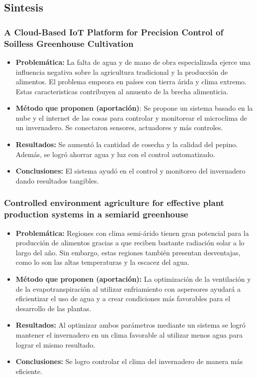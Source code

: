 \documentclass[final,12pt]{article}
\begin{document}
\subsection{Sintesis}
\subsubsection{A Cloud-Based IoT Platform for Precision Control of Soilless Greenhouse Cultivation}
\begin{itemize}
    \item \textbf{Problemática: }
    La falta de agua y de mano de obra especializada ejerce una influencia negativa sobre la agricultura tradicional y la producción de alimentos. El problema empeora en países con tierra árida y clima extremo. Estas caracteristicas contribuyen al amuento de la brecha alimenticia.
    \item \textbf{Método que proponen (aportación)}: Se propone un sistema basado en la nube y el internet de las cosas para controlar y monitorear el microclima de un invernadero. Se conectaron sensores, actuadores y más controles.
    \item \textbf{Resultados: } Se aumentó la cantidad de cosecha y la calidad del pepino. Además, se logró ahorrar agua y luz con el control automatizado.
    \item \textbf{Conclusiones: } El sistema ayudó en el control y monitoreo del invernadero dando resultados tangibles.
\end{itemize}

\subsubsection{Controlled environment agriculture for effective plant production systems in a semiarid greenhouse}
\begin{itemize}
    \item \textbf{Problemática:} Regiones con clima semi-árido tienen gran potencial para la producción de alimentos gracias a que reciben bastante radiación solar a lo largo del año. Sin embargo, estas regiones también presentan desventajas, como lo son las altas temperaturas y la escacez del agua.
    \item \textbf{Método que proponen (aportación):} La optimización de la ventilación y de la evapotranspiración al utilizar enfriamiento con aspersores ayudará a eficientizar el uso de agua y a crear condiciones más favorables para el desarrollo de las plantas.
    \item \textbf{Resultados:} Al optimizar ambos parámetros mediante un sistema se logró mantener el invernadero en un clima favorable al utilizar menos agua para lograr el mismo resultado.
    \item \textbf{Conclusiones:} Se logro controlar el clima del invernadero de manera más eficiente.
\end{itemize}
\end{document}
